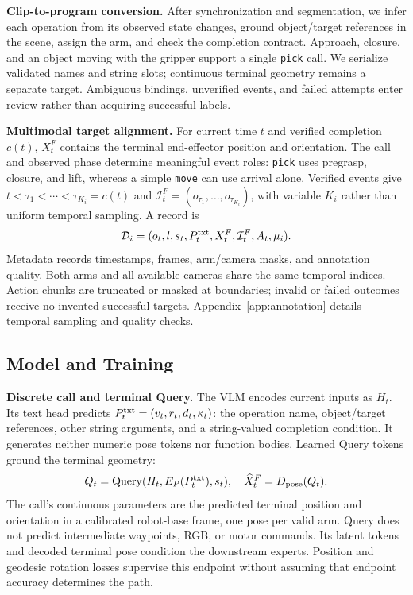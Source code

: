 \textbf{Clip-to-program conversion.} After synchronization and segmentation, we infer each operation from its observed state changes, ground object/target references in the scene, assign the arm, and check the completion contract. Approach, closure, and an object moving with the gripper support a single \texttt{pick} call. We serialize validated names and string slots; continuous terminal geometry remains a separate target. Ambiguous bindings, unverified events, and failed attempts enter review rather than acquiring successful labels.

\textbf{Multimodal target alignment.} For current time $t$ and verified completion $c(t)$, $X_t^F$ contains the terminal end-effector position and orientation. The call and observed phase determine meaningful event roles: \texttt{pick} uses pregrasp, closure, and lift, whereas a simple \texttt{move} can use arrival alone. Verified events give $t<\tau_1<\cdots<\tau_{K_i}=c(t)$ and $\mathcal I_t^F=(o_{\tau_1},\ldots,o_{\tau_{K_i}})$, with variable $K_i$ rather than uniform temporal sampling. A record is
\begin{equation}
\mathcal D_i=(o_t,l,s_t,P_t^{\rm txt},X_t^F,\mathcal I_t^F,A_t,\mu_i).
\label{eq:record}
\end{equation}
Metadata records timestamps, frames, arm/camera masks, and annotation quality. Both arms and all available cameras share the same temporal indices. Action chunks are truncated or masked at boundaries; invalid or failed outcomes receive no invented successful targets. Appendix~\ref{app:annotation} details temporal sampling and quality checks.

\subsection{Model and Training}
\label{sec:program}
\textbf{Discrete call and terminal Query.} The VLM encodes current inputs as $H_t$. Its text head predicts $P_t^{\rm txt}=(v_t,r_t,d_t,\kappa_t)$: the operation name, object/target references, other string arguments, and a string-valued completion condition. It generates neither numeric pose tokens nor function bodies. Learned Query tokens ground the terminal geometry:
\begin{equation}
Q_t=\operatorname{Query}(H_t,E_P(P_t^{\rm txt}),s_t),\quad
\widehat X_t^F=D_{\rm pose}(Q_t).
\label{eq:query}
\end{equation}
\label{sec:query}
The call's continuous parameters are the predicted terminal position and orientation in a calibrated robot-base frame, one pose per valid arm. Query does not predict intermediate waypoints, RGB, or motor commands. Its latent tokens and decoded terminal pose condition the downstream experts. Position and geodesic rotation losses supervise this endpoint without assuming that endpoint accuracy determines the path.

